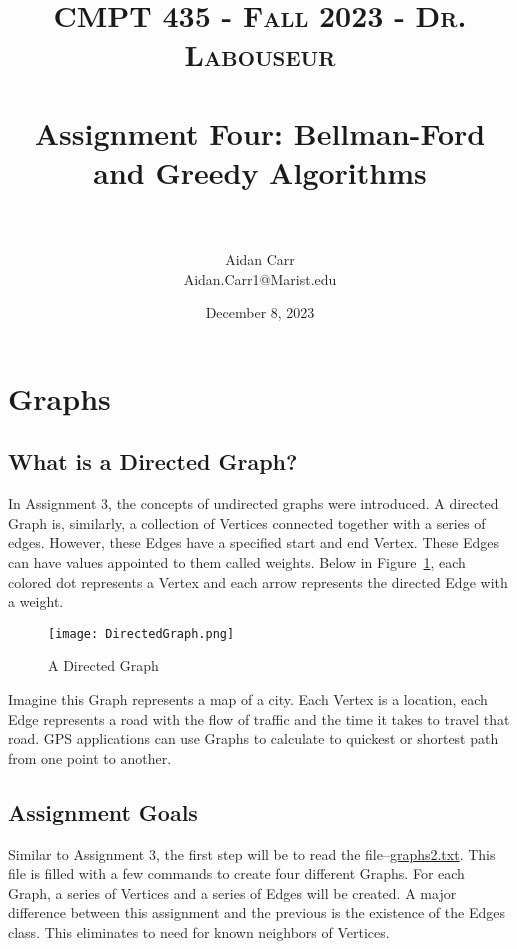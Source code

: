 \documentclass[letterpaper, 10pt,DIV=13]{scrartcl}
\title{	
   \normalfont \normalsize 
   \textsc{CMPT 435 - Fall 2023 - Dr. Labouseur} \\[10pt] %
   \horrule{0.5pt} \\[0.25cm] 	%
   \huge Assignment Four: Bellman-Ford and Greedy Algorithms  \\
   \horrule{0.5pt} \\[0.25cm] 	%
}
\author{Aidan Carr \\ \normalsize Aidan.Carr1@Marist.edu}
\date{\normalsize December 8, 2023} 	%
\numberwithin{equation}{section} %
\numberwithin{figure}{section} %
\numberwithin{table}{section} %
\begin{document}
\maketitle %

\section{Graphs}

\subsection{What is a Directed Graph?}
In Assignment 3, the concepts of undirected graphs were introduced. A directed Graph is, similarly, a collection of Vertices connected together with a series of edges. However, these Edges have a specified start and end Vertex. These Edges can have values appointed to them called weights. Below in Figure~\ref{figure:DirectedGraph}, each colored dot represents a Vertex and each arrow represents the directed Edge with a weight. 

\begin{figure}[h] 
    \centering 
    \texttt{[image: DirectedGraph.png]}
    \caption{A Directed Graph\footnotemark}
    \label{figure:DirectedGraph}
    
\end{figure}

Imagine this Graph represents a map of a city. Each Vertex is a location, each Edge represents a road with the flow of traffic and the time it takes to travel that road. GPS applications can use Graphs to calculate to quickest or shortest path from one point to another.

\subsection{Assignment Goals}
Similar to Assignment 3, the first step will be to read the file--\href{https://www.labouseur.com/courses/algorithms/graphs2.txt}{graphs2.txt}. This file is filled with a few commands to create four different Graphs. For each Graph, a series of Vertices and a series of Edges will be created. A major difference between this assignment and the previous is the existence of the Edges class. This eliminates to need for known neighbors of Vertices.
\end{document}
